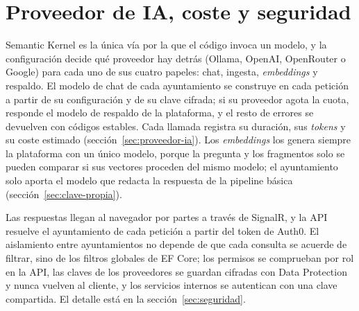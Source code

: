 \section{Proveedor de IA, coste y seguridad}
\label{sec:diseno-resumen-ia}

Semantic Kernel \cite{semantickernel} es la única vía por la que el código invoca un modelo, y la configuración decide qué proveedor hay detrás (Ollama, OpenAI, OpenRouter o Google) para cada uno de sus cuatro papeles: chat, ingesta, \emph{embeddings} y respaldo. El modelo de chat de cada ayuntamiento se construye en cada petición a partir de su configuración y de su clave cifrada; si su proveedor agota la cuota, responde el modelo de respaldo de la plataforma, y el resto de errores se devuelven con códigos estables. Cada llamada registra su duración, sus \emph{tokens} y su coste estimado (sección~\ref{sec:proveedor-ia}). Los \emph{embeddings} los genera siempre la plataforma con un único modelo, porque la pregunta y los fragmentos solo se pueden comparar si sus vectores proceden del mismo modelo; el ayuntamiento solo aporta el modelo que redacta la respuesta de la pipeline básica (sección~\ref{sec:clave-propia}).

Las respuestas llegan al navegador por partes a través de SignalR, y la API resuelve el ayuntamiento de cada petición a partir del token de Auth0. El aislamiento entre ayuntamientos no depende de que cada consulta se acuerde de filtrar, sino de los filtros globales de EF Core; los permisos se comprueban por rol en la API, las claves de los proveedores se guardan cifradas con Data Protection y nunca vuelven al cliente, y los servicios internos se autentican con una clave compartida. El detalle está en la sección~\ref{sec:seguridad}.
